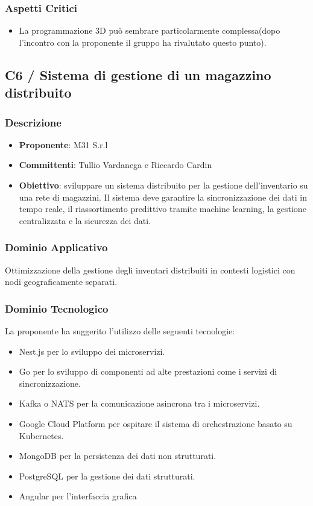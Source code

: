 \documentclass[a4paper, 12pt]{article}
\begin{document}
\subsubsection{Aspetti Critici}
\begin{itemize}
    \item La programmazione 3D può sembrare particolarmente complessa(dopo l'incontro con la proponente il gruppo ha rivalutato questo punto).
\end{itemize}

\subsection{C6 / Sistema di gestione di un magazzino distribuito}
\subsubsection{Descrizione}
\begin{itemize}
    \item \textbf{Proponente}: M31 S.r.l
    \item \textbf{Committenti}: Tullio Vardanega e Riccardo Cardin
    \item \textbf{Obiettivo}: sviluppare un sistema distribuito per la gestione dell'inventario su una rete di magazzini. Il sistema deve garantire la sincronizzazione dei dati in tempo reale, il riassortimento predittivo tramite machine learning, la gestione centralizzata e la sicurezza dei dati.
\end{itemize}

\subsubsection{Dominio Applicativo}
Ottimizzazione della gestione degli inventari distribuiti in contesti logistici con nodi geograficamente separati.

\subsubsection{Dominio Tecnologico}
La proponente ha suggerito l’utilizzo delle seguenti tecnologie:
\begin{itemize}
    \item Nest.js per lo sviluppo dei microservizi.
    \item Go per lo sviluppo di componenti ad alte prestazioni come i servizi di sincronizzazione.
    \item Kafka o NATS per la comunicazione asincrona tra i microservizi.
    \item Google Cloud Platform per ospitare il sistema di orchestrazione basato su Kubernetes.
    \item MongoDB per la persistenza dei dati non strutturati.
    \item PostgreSQL per la gestione dei dati strutturati.
    \item Angular per l’interfaccia grafica
\end{itemize}
\end{document}

